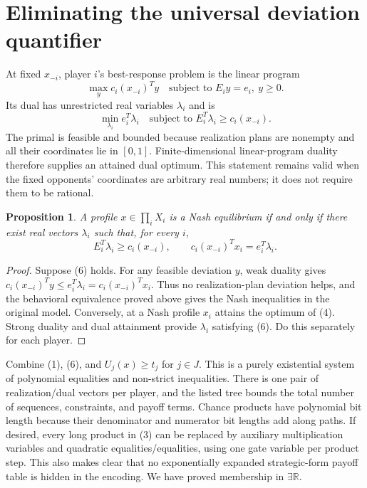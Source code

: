 \documentclass[11pt]{article}
\newtheorem{proposition}{Proposition}
\begin{document}
\section*{Eliminating the universal deviation quantifier}
At fixed $x_{-i}$, player $i$'s best-response problem is the linear program
\[
 \max_y c_i(x_{-i})^Ty
          \quad\text{subject to }E_iy=e_i,\ y\geq0.              \tag{4}
\]
Its dual has unrestricted real variables $\lambda_i$ and is
\[
 \min_{\lambda_i}e_i^T\lambda_i
          \quad\text{subject to }E_i^T\lambda_i\geq c_i(x_{-i}). \tag{5}
\]
The primal is feasible and bounded because realization plans are
nonempty and all their coordinates lie in $[0,1]$. Finite-dimensional
linear-program duality therefore supplies an attained dual optimum.
This statement remains valid when the fixed opponents' coordinates are
arbitrary real numbers; it does not require them to be rational.

\begin{proposition}
A profile $x\in\prod_iX_i$ is a Nash equilibrium if and only if there
exist real vectors $\lambda_i$ such that, for every $i$,
\[
 E_i^T\lambda_i\geq c_i(x_{-i}),\qquad
 c_i(x_{-i})^Tx_i=e_i^T\lambda_i.                                \tag{6}
\]
\end{proposition}
\begin{proof}
Suppose (6) holds. For any feasible deviation $y$, weak duality gives
$c_i(x_{-i})^Ty\leq e_i^T\lambda_i=c_i(x_{-i})^Tx_i$.
Thus no realization-plan deviation helps, and the behavioral equivalence
proved above gives the Nash inequalities in the original model.
Conversely, at a Nash profile $x_i$ attains the optimum of (4).
Strong duality and dual attainment provide $\lambda_i$ satisfying (6).
Do this separately for each player.
\end{proof}

Combine (1), (6), and $U_j(x)\geq t_j$ for $j\in J$. This is a purely
existential system of polynomial equalities and non-strict inequalities.
There is one pair of realization/dual vectors per player, and the listed
tree bounds the total number of sequences, constraints, and payoff terms.
Chance products have polynomial bit length because their denominator and
numerator bit lengths add along paths. If desired, every long product in
(3) can be replaced by auxiliary multiplication variables and quadratic
equalities/equalities, using one gate variable per product step. This
also makes clear that no exponentially expanded strategic-form payoff
table is hidden in the encoding. We have proved membership in
$\exists\mathbb R$.
\end{document}
